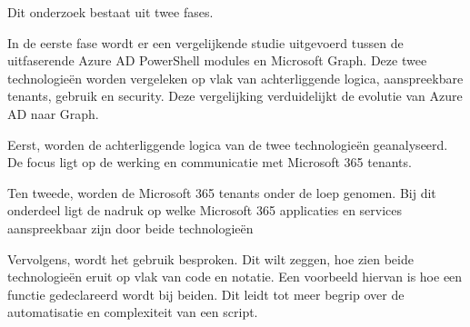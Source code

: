 \begin{comment}
In de derde fase volgt een nabootsing van een realistische Linux-omgeving. Aan de hand van geautomatiseerde configuraties ontstaat de mogelijkheid om een omgeving op te zetten. Hierbij wordt Ansible als Configuration Management tool ingezet voor het opzetten van de infrastructuur. In de testomgeving voorzien we vier virtuele servers en een virtuele client. Waarbij alle virtuele machines AlmaLinux \autocite{AOF2022} als distributie gebruiken. De eerste server maakt gebruik van BIND \autocite{ISC2022} om de DNS (Domain Name System) te voorzien. De tweede server voorziet DHCP (Dynamic Host Configuration Protocol) met dynamische IP-adressen voor de virtuele client. De derde server fungeert als webserver en databank met een \textcite{WordPress2022} installatie. De laatste server maakt gebruik van Prometheus \autocite{PrometheusAuthors2022} en Grafana \autocite{GrafanaLabs2022} om de servers te kunnen monitoren. De client is een gebruiker van het domein en test de beschikbare functionaliteiten.

De laatste fase omvat een Disaster Recovery-scenario waarbij de omgeving wordt beschadigd. Door deze beschadiging wordt de omgeving nogmaals opgezet aan de hand van automatisatie uit de tweede fase. Er wordt gekeken naar welke impact de automatisatie heeft in vergelijking met de manuele manier van configureren. Deze impact wordt geanalyseerd en getest, nadien worden alle bevinden verwerkt in de scriptie.

\end{comment}

Dit onderzoek bestaat uit twee fases.
 
In de eerste fase wordt er een vergelijkende studie uitgevoerd tussen de uitfaserende Azure AD PowerShell modules en Microsoft Graph. Deze twee technologieën worden vergeleken op vlak van achterliggende logica, aanspreekbare tenants, gebruik en security. Deze vergelijking verduidelijkt de evolutie van Azure AD naar Graph.

Eerst, worden de achterliggende logica van de twee technologieën geanalyseerd. De focus ligt op de werking en communicatie met Microsoft 365 tenants. 

Ten tweede, worden de Microsoft 365 tenants onder de loep genomen. Bij dit onderdeel ligt de nadruk op welke Microsoft 365 applicaties en services aanspreekbaar zijn door beide technologieën

Vervolgens, wordt het gebruik besproken. Dit wilt zeggen, hoe zien beide technologieën eruit op vlak van code en notatie. Een voorbeeld hiervan is hoe een functie gedeclareerd wordt bij beiden. Dit leidt tot meer begrip over de automatisatie en complexiteit van een script.

